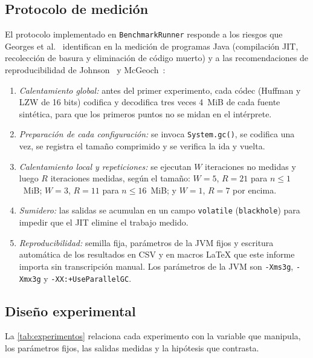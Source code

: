 \subsection{Protocolo de medición}
\label{sec:protocolo}
El protocolo implementado en \texttt{BenchmarkRunner} responde a los riesgos que Georges et
al.~\cite{georges2007} identifican en la medición de programas Java (compilación JIT,
recolección de basura y eliminación de código muerto) y a las recomendaciones de
reproducibilidad de Johnson~\cite{johnson2002} y McGeoch~\cite{mcgeoch2012}:
\begin{enumerate}[leftmargin=*]
  \item \emph{Calentamiento global:} antes del primer experimento, cada códec (Huffman y LZW de
        16 bits) codifica y decodifica tres veces 4~MiB de cada fuente sintética, para
        que los primeros puntos no se midan en el intérprete.
  \item \emph{Preparación de cada configuración:} se invoca \texttt{System.gc()}, se codifica una
        vez, se registra el tamaño comprimido y se verifica la ida y vuelta.
  \item \emph{Calentamiento local y repeticiones:} se ejecutan $W$ iteraciones no medidas y luego
        $R$ iteraciones medidas, según el tamaño: $W = 5$, $R = 21$ para $n \le 1$~MiB;
        $W = 3$, $R = 11$ para $n \le 16$~MiB; y $W = 1$, $R = 7$ por encima.
  \item \emph{Sumidero:} las salidas se acumulan en un campo \texttt{volatile}
        (\texttt{blackhole}) para impedir que el JIT elimine el trabajo medido.
  \item \emph{Reproducibilidad:} semilla fija, parámetros de la JVM fijos
        y escritura automática de los resultados en CSV y en macros \LaTeX{} que este informe
        importa sin transcripción manual. Los parámetros de la JVM son \texttt{-Xms3g},
        \texttt{-Xmx3g} y \texttt{-XX:+UseParallelGC}.
\end{enumerate}

\subsection{Diseño experimental}
\label{sec:experimentos}
La \cref{tab:experimentos} relaciona cada experimento con la variable que manipula, los
parámetros fijos, las salidas medidas y la hipótesis que contrasta.

